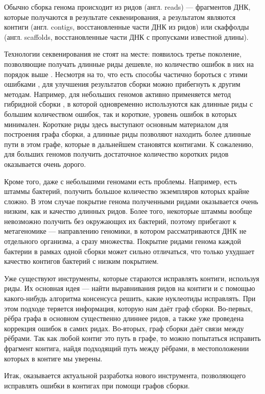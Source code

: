 \documentclass[14pt]{matmex-diploma-custom}
\begin{document}
Обычно сборка генома происходит из ридов (англ. reads) --- фрагментов ДНК, которые получаются в результате секвенирования, а результатом являются контиги (англ. contigs, восстановленные части ДНК из ридов) или скаффолды (англ. scaffolds, восстановленные части ДНК с пропусками известной длины).

Технологии секвенирования не стоят на месте: появилось третье поколение, позволяющие получать длинные риды дешевле, но количество ошибок в них на порядок выше \cite{art:reads}. Несмотря на то, что есть способы частично бороться с этими ошибками \cite{art:alic2016objective}, для улучшения результатов сборки можно прибегнуть к другим методам. Например, для небольших геномов активно применяется метод гибридной сборки \cite{art:hybridSpades}, в которой одновременно используются как длинные риды с большим количеством ошибок, так и короткие, уровень ошибок в которых минимален. Короткие риды здесь выступают основным материалом для построения графа сборки, а длинные риды позволяют находить более длинные пути в этом графе, которые в дальнейшем становятся контигами. К сожалению, для больших геномов получить достаточное количество коротких ридов оказывается очень дорого.

Кроме того, даже с небольшими геномами есть проблемы. Например, есть штаммы бактерий, получить большое количество экземпляров которых крайне сложно. В этом случае покрытие генома полученными ридами оказывается очень низким, как и качество длинных ридов. Более того, некоторые штаммы вообще невозможно получить без окружающих их бактерий, поэтому прибегают к метагеномике --- направлению геномики, в котором рассматриваются ДНК не отдельного организма, а сразу множества. Покрытие ридами генома каждой бактерии в рамках одной сборки может сильно отличаться, что только ухудшает качество контигов бактерий с низким покрытием.

Уже существуют инструменты, которые стараются исправлять контиги, используя риды. Их основная идея --- найти выравнивания ридов на контиги и с помощью какого-нибудь алгоритма консенсуса решить, какие нуклеотиды исправлять. При этом подходе теряется информация, которую нам даёт граф сборки. Во-первых, рёбра графа в основном существенно длиннее ридов, а также уже проведена коррекция ошибок в самих ридах. Во-вторых, граф сборки даёт связи между рёбрами. Так как любой контиг это путь в графе, то можно попытаться исправить фрагмент контига, найдя подходящий путь между рёбрами, в местоположении которых в контиге мы уверены.

Итак, оказывается актуальной разработка нового инструмента, позволяющего исправлять ошибки в контигах при помощи графов сборки.
\end{document}
